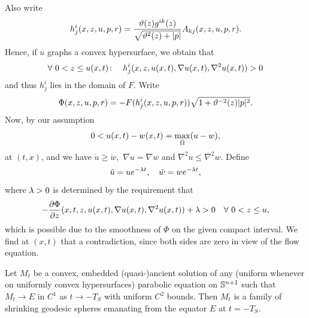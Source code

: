 \documentclass{amsart}
\begin{document}
{Also write
$$h^i_j(x,z,u,p,r)=\fr{\vt(z)g^{ik}(z)}{\sqrt{\vt^2(z)+|p|}}A_{kj}(x,z,u,p,r).$$
Hence, if $u$ graphs a convex hypersurface, we obtain that
$$\forall~ 0<z\leq u(x,t)\cn\quad h^i_j(x,z,u(x,t),\nabla u(x,t),\nabla^2u(x,t))>0$$
 and thus $h^i_j$ lies in the domain of $F.$ Write
  $$\Phi(x,z,u,p,r)=-F(h^i_j(x,z,u,p,r))\sqrt{1+\vt^{-2}(z)|p|^2}.$$
Now, by our assumption 
 $$0<u(x,t)-w(x,t)=\max_{\-\O}(u-w),$$
 at $(t,x)$, and we have $\dot{u}\geq \dot{w},$ $\nabla u=\nabla w$ and $\nabla^2u\leq \nabla^2w.$ Define 
 $$\~u=ue^{-\l t},\quad \~w=we^{-\l t},$$
 where $\l>0$ is determined by the requirement that
$$-\fr{\del\Phi}{\del z}(x,t,z,u(x,t),\nabla u(x,t),\nabla^2 u(x,t))+\l>0\quad\forall~ 0<z\leq u,
$$
 which is possible due to the smoothness of $\Phi$ on the given compact interval. We find at $(x,t)$ that
 a contradiction, since both sides are zero in view of the flow equation.
}
\begin{thm}
\label{thm:classification}
Let \(M_t\) be a convex, embedded (quasi-)ancient solution of any (uniform whenever on uniformly convex hypersurfaces) parabolic equation on \(\S^{n+1}\) such that \(M_t \to E\) in \(C^1\) as \(t \to -T_S\) with uniform \(C^2\) bounds. Then \(M_t\) is a family of shrinking geodesic spheres emanating from the equator \(E\) at \(t=-T_S\).
\end{thm}
\end{document}

